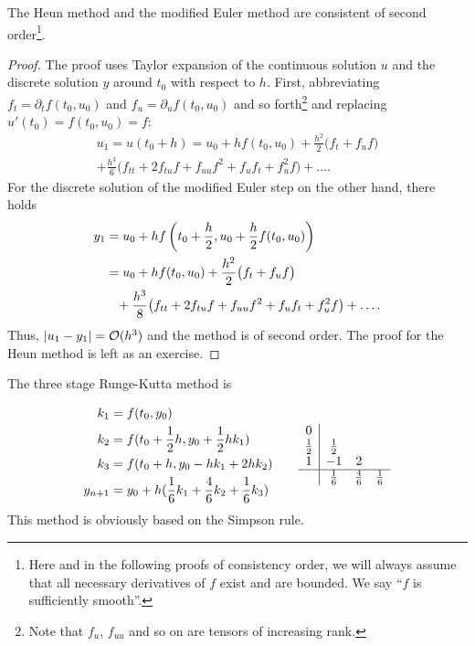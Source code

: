 \begin{Lemma}
  The Heun method and the modified Euler method are consistent of second
  order\footnote{Here and in the following proofs of consistency
    order, we will always assume that all necessary derivatives of $f$
  exist and are bounded. We say ``$f$ is sufficiently smooth''.}.
\end{Lemma}

\begin{proof}
  The proof uses Taylor expansion of the continuous solution $u$ and
  the discrete solution $y$ around $t_0$ with respect to $h$. First,
  abbreviating $f_t = \partial_t f(t_0,u_0)$ and
  $f_u = \partial_u f(t_0,u_0)$ and so forth\footnote{Note that $f_u$,
    $f_{u u}$ and so on are tensors of increasing rank.} and replacing
  $u'(t_0)=f(t_0,u_0) = f$:
  \begin{multline}
    \label{eq:explicit:4}
    u_1 = u(t_0+h) = u_0 + h f(t_0, u_0)
    + \frac{h^2}2\bigl(f_t + f_u f\bigr)
    \\
    + \frac{h^3}6\bigl(f_{t t}+2f_{t u}f+f_{u u}f^2+f_u f_t+f_u^2f\bigr)
    + \dots.
  \end{multline}
  For the discrete solution of the modified Euler step on the other
  hand, there holds
  \begin{align*}
    y_1 &= u_0 + h f\left(t_0+\frac h2, u_0+\frac h2 f(t_0,u_0)\right)
    \\
    &= u_0 + h f(t_0, u_0) + \frac{h^2}2 \bigl(f_t + f_u f\bigr)
    \\&\hphantom{...}
      + \frac{h^3}8\bigl(f_{t t}+2f_{t u}f+f_{u u}f^2+f_u f_t+f_u^2f\bigr)
        +\dots.
  \end{align*}
  Thus, $\lvert u_1-y_1\rvert = \mathcal O(h^3)$ and the method is of second
  order. The proof for the Heun method is left as an exercise.
\end{proof}

\begin{example}
  The three stage Runge-Kutta method is

  \begin{gather*}
    \begin{aligned}
      k_1 & = f(t_0, y_0) \\
      k_2 & = f(t_0 + \frac12 h, y_0 + \frac12 h k_1) \\
      k_3 & = f(t_0 + h, y_0 - h k_1 + 2 h k_2) \\
      y_{n+1} & = y_0 + h ( \frac16 k_1 + \frac46 k_2 + \frac16 k_3 ) \\
    \end{aligned}
    \qquad
    \begin{array}{c|ccc}
      0 & \\
      \frac12 & \frac12 \\
      1 & -1 & 2 \\
      \hline
        & \frac16 & \frac46 & \frac16 \\
    \end{array}
  \end{gather*}
  This method is obviously based on the Simpson rule.
\end{example}


